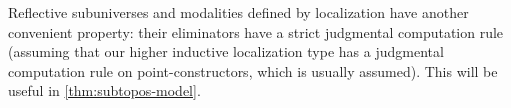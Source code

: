\begin{rmk}
  Reflective subuniverses and modalities defined by localization have another convenient property: their eliminators have a strict judgmental computation rule (assuming that our higher inductive localization type has a judgmental computation rule on point-constructors, which is usually assumed).
  This will be useful in \cref{thm:subtopos-model}.
\end{rmk}
